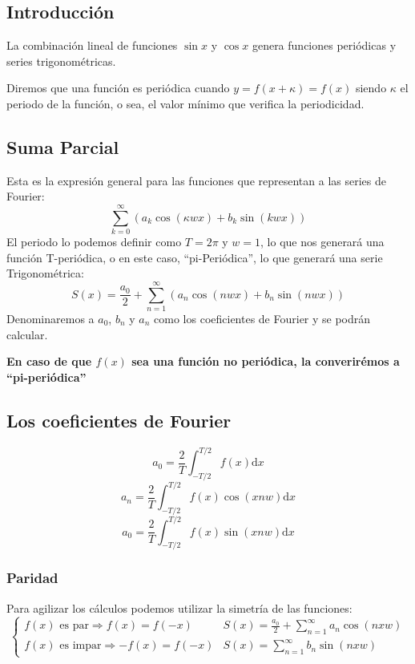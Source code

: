 \subsection{Introducción}
 La combinación lineal de funciones \(\sin{x}\) y \(\cos{x}\) genera funciones periódicas y series trigonométricas.
\par  Diremos que una función es periódica cuando \(y = f(x + \kappa) = f(x)\) siendo \(\kappa\) el periodo de la función, o sea, el valor mínimo que verifica la periodicidad.
\subsection{Suma Parcial}
 Esta es la expresión general para las funciones que representan a las series de Fourier:
\[
        \boxed{\sum^{\infty}_{k=0}(a_k \cos{(\kappa w x)} + b_k \sin{(kwx)})}
\]
 El periodo lo podemos definir como \(T = 2\pi\) y \(w = 1\), lo que nos generará una función T-periódica, o en este caso, ``pi-Periódica'', lo que generará una serie Trigonométrica:
\[
        \boxed{S(x) = \frac{a_0}{2}+\sum^{\infty}_{n=1}(a_n \cos{( nw x)} + b_n \sin{(nwx)})}
\]
 Denominaremos a \(a_0\), \(b_n\) y \(a_n\) como los coeficientes de Fourier y se podrán calcular.
\par  \textbf{En caso de que \(f(x)\) sea una función no periódica, la converirémos a ``pi-periódica''}
\subsection{Los coeficientes de Fourier}
\[
        \boxed{a_0 = \frac{2}{T} \int^{T/2}_{-T/2}f(x)\mathrm{d} x}
\]
\[
        \boxed{a_n = \frac{2}{T} \int^{T/2}_{-T/2}f(x)\cos{(xnw)}\mathrm{d} x}
\]
\[
        \boxed{a_0 = \frac{2}{T} \int^{T/2}_{-T/2}f(x)\sin{(xnw)}\mathrm{d} x}
\]
\subsubsection{Paridad}
 Para agilizar los cálculos podemos utilizar la simetría de las funciones:
\[
        \begin{cases}
                \text{\(f(x)\) es par} \Rightarrow f(x) = f(-x)    & S(x) = \frac{a_0}{2} +\sum^{\infty}_{n=1}a_n \cos{(nxw)}
                \\
                \text{\(f(x)\) es impar} \Rightarrow -f(x) = f(-x) & S(x)=\sum^{\infty}_{n=1}b_n \sin{(nxw)}
        \end{cases}
\]
